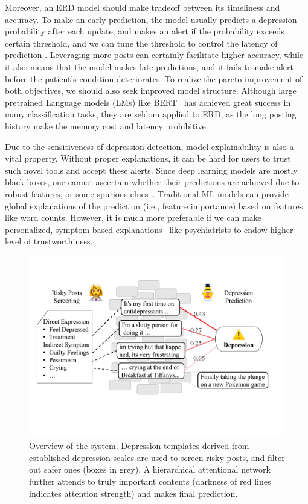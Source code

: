 Moreover, an ERD model should make tradeoff between its timeliness and accuracy. 
To make an early prediction, the model usually predicts a depression probability 
after each update, and makes an alert if the probability exceeds certain threshold, and we can tune the threshold to control the latency of prediction \cite{trotzek2018utilizing}. Leveraging more posts can certainly facilitate higher accuracy, while it also means that the model makes late predictions, and it fails to make alert before the patient's condition deteriorates. To realize the pareto improvement of both objectives, 
we should also seek improved model structure. 
Although large pretrained Language models (LMs) like BERT~\cite{devlin2018bert} 
has achieved great success in many classification tasks, 
they are seldom applied to ERD, as the long posting history make 
the memory cost and latency prohibitive. 

Due to the sensitiveness of depression detection, model explainability is also 
a vital property. Without proper explanations, it can be hard for users to trust such novel tools and accept these alerts. Since 
deep learning models are mostly black-boxes, one cannot ascertain whether their
predictions are achieved due to robust features, or some spurious clues~\cite{ribeiro2020beyond}. Traditional ML models can provide global explanations of the prediction (i.e., feature importance) based on features like word counts. However, it is much
more preferable if we can make personalized, symptom-based explanations~\cite{mowery2017understanding} like psychiatrists to endow higher level of trustworthiness. 

\begin{figure}[t]
    \centering
    \includegraphics[width=\columnwidth]{figures/overview1.pdf}
    \caption{Overview of the system. Depression templates derived from established depression scales are used to screen risky posts, and filter out safer ones (boxes in grey). A hierarchical attentional network further attends to truly important contents (darkness of red lines indicates attention strength) and makes final prediction. }
    \label{fig:overview}
\end{figure}

